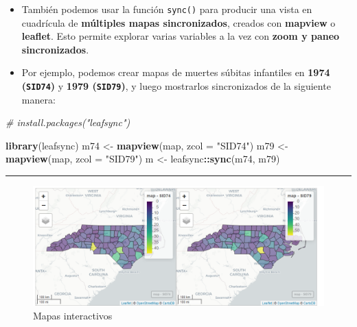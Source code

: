 \documentclass[
]{book}
\newenvironment{Shaded}{\begin{snugshade}}{\end{snugshade}}
\newcommand{\AttributeTok}[1]{\textcolor[rgb]{0.13,0.29,0.53}{#1}}
\newcommand{\CommentTok}[1]{\textcolor[rgb]{0.56,0.35,0.01}{\textit{#1}}}
\newcommand{\FunctionTok}[1]{\textcolor[rgb]{0.13,0.29,0.53}{\textbf{#1}}}
\newcommand{\NormalTok}[1]{#1}
\newcommand{\OtherTok}[1]{\textcolor[rgb]{0.56,0.35,0.01}{#1}}
\newcommand{\SpecialCharTok}[1]{\textcolor[rgb]{0.81,0.36,0.00}{\textbf{#1}}}
\newcommand{\StringTok}[1]{\textcolor[rgb]{0.31,0.60,0.02}{#1}}
\begin{document}
\begin{itemize}
\item
  También podemos usar la función \texttt{sync()} para producir una vista en cuadrícula de \textbf{múltiples mapas sincronizados}, creados con \textbf{mapview} o \textbf{leaflet}. Esto permite explorar varias variables a la vez con \textbf{zoom y paneo sincronizados}.
\item
  Por ejemplo, podemos crear mapas de muertes súbitas infantiles en \textbf{1974 (\texttt{SID74})} y \textbf{1979 (\texttt{SID79})}, y luego mostrarlos sincronizados de la siguiente manera:
\end{itemize}

\begin{Shaded}
\begin{Highlighting}[]
\CommentTok{\# install.packages("leafsync")}

\FunctionTok{library}\NormalTok{(leafsync)}
\NormalTok{m74 }\OtherTok{\textless{}{-}} \FunctionTok{mapview}\NormalTok{(map, }\AttributeTok{zcol =} \StringTok{"SID74"}\NormalTok{)}
\NormalTok{m79 }\OtherTok{\textless{}{-}} \FunctionTok{mapview}\NormalTok{(map, }\AttributeTok{zcol =} \StringTok{"SID79"}\NormalTok{)}
\NormalTok{m }\OtherTok{\textless{}{-}}\NormalTok{ leafsync}\SpecialCharTok{::}\FunctionTok{sync}\NormalTok{(m74, m79)}
\end{Highlighting}
\end{Shaded}

\begin{center}\rule{0.5\linewidth}{0.5pt}\end{center}

\begin{figure}

{\centering \includegraphics[width=1\linewidth]{images/mapa} 

}

\caption{Mapas interactivos}\label{fig:figa-4}
\end{figure}
\end{document}
